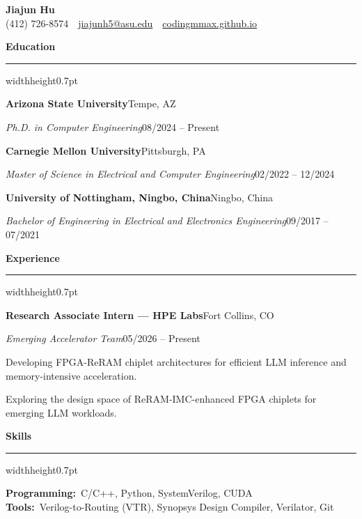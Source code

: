\documentclass[10pt,letterpaper]{article}
\newcommand{\cvsection}[1]{%
  \vspace{3pt}\par\nopagebreak
  {\normalsize\bfseries\color{navy}#1\par}\vspace{1pt}\nopagebreak
  {\color{navy}\hrule width\linewidth height0.7pt}\nopagebreak
  \vspace{2pt}\nopagebreak}
\newcommand{\entry}[2]{\textbf{#1}\hfill{\color{gray}#2}\par}
\newenvironment{cvlist}{%
  \begin{list}{\textbullet}{%
    \setlength{\itemsep}{3pt}\setlength{\parsep}{0pt}%
    \setlength{\topsep}{0pt}\setlength{\partopsep}{0pt}%
    \setlength{\leftmargin}{1.2em}\setlength{\labelwidth}{0.7em}%
    \setlength{\labelsep}{0.5em}}}%
  {\end{list}}
\begin{document}
{\centering
  {\fontsize{19}{22}\selectfont\bfseries\color{navy}Jiajun Hu}\\[5pt]
  \small\color{gray}(412) 726-8574\ \textbar\
  \href{mailto:jiajunh5@asu.edu}{jiajunh5@asu.edu}\ \textbar\
  \href{https://codingmmax.github.io/}{codingmmax.github.io}\par}
\vspace{4pt}

\cvsection{Education}

\entry{Arizona State University}{Tempe, AZ}
\emph{Ph.D. in Computer Engineering}\hfill{\color{gray}08/2024 -- Present}

\entry{Carnegie Mellon University}{Pittsburgh, PA}
\emph{Master of Science in Electrical and Computer Engineering}\hfill{\color{gray}02/2022 -- 12/2024}

\entry{University of Nottingham, Ningbo, China}{Ningbo, China}
\emph{Bachelor of Engineering in Electrical and Electronics Engineering}\hfill{\color{gray}09/2017 -- 07/2021}

\cvsection{Experience}

\entry{Research Associate Intern --- HPE Labs}{Fort Collins, CO}
\emph{Emerging Accelerator Team}\hfill{\color{gray}05/2026 -- Present}
\begin{cvlist}
  \item Developing FPGA-ReRAM chiplet architectures for efficient LLM inference and memory-intensive acceleration.
  \item Exploring the design space of ReRAM-IMC-enhanced FPGA chiplets for emerging LLM workloads.
\end{cvlist}

\cvsection{Skills}

\textbf{Programming:}\ C/C++, Python, SystemVerilog, CUDA\\
\textbf{Tools:}\ Verilog-to-Routing (VTR), Synopsys Design Compiler, Verilator, Git
\end{document}
